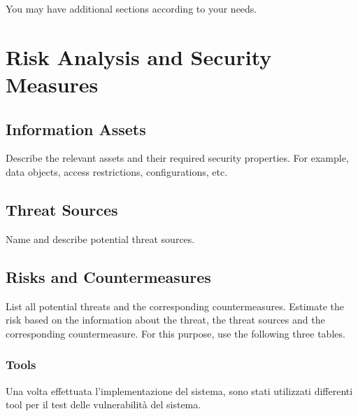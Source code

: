 \documentclass{article}
\begin{document}
You may have additional sections according to your needs.


\section{Risk Analysis and Security Measures}

\subsection{Information Assets}

Describe the relevant assets and their required security
  properties. For example, data objects, access restrictions,
  configurations, etc.

\subsection{Threat Sources}

Name and describe potential threat sources.

\subsection{Risks and Countermeasures}

List all potential threats and the
  corresponding countermeasures. Estimate the risk based on 
  the information about the threat, the threat sources and the 
  corresponding countermeasure. For this purpose, use the following three
  tables.

\subsubsection{Tools}
Una volta effettuata l'implementazione del sistema, sono stati utilizzati differenti tool per il test delle vulnerabilità del sistema.
\end{document}

